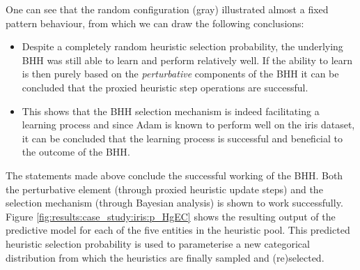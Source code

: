 One can see that the random configuration (gray) illustrated almost a fixed pattern behaviour, from which we can draw the following conclusions:

\begin{itemize}
    \item Despite a completely random heuristic selection probability, the underlying \Acs{BHH} was still able to learn and perform relatively well. If the ability to learn is then purely based on the \textit{perturbative} components of the \Acs{BHH} it can be concluded that the proxied heuristic step operations are successful.
    
    \item This shows that the \Acs{BHH} selection mechanism is indeed facilitating a learning process and since \Acs{Adam} is known to perform well on the iris dataset, it can be concluded that the learning process is successful and beneficial to the outcome of the \Acs{BHH}.
\end{itemize}

The statements made above conclude the successful working of the \Acs{BHH}. Both the perturbative element (through proxied heuristic update steps) and the selection mechanism (through Bayesian analysis) is shown to work successfully. Figure \ref{fig:results:case_study:iris:p_HgEC} shows the resulting output of the predictive model for each of the five entities in the heuristic pool. This predicted heuristic selection probability is used to parameterise a new categorical distribution from which the heuristics are finally sampled and (re)selected. 


